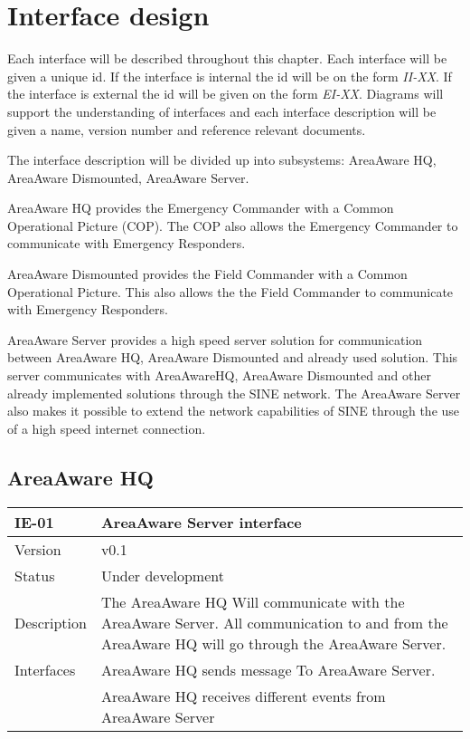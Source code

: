 \label{chp_interfaceDesign}
\chapter{Interface design}
Each interface will be described throughout this chapter. Each interface will be given a unique id. If the interface is internal the id will be on the form \emph{II-XX}. If the interface is external the id will be given on the form \emph{EI-XX}. Diagrams will support the understanding of interfaces and each interface description will be given a name, version number and reference relevant documents.

The interface description will be divided up into subsystems: AreaAware HQ, AreaAware Dismounted, AreaAware Server.

AreaAware HQ provides the Emergency Commander with a Common Operational Picture (COP). The COP also allows the Emergency Commander to communicate with Emergency Responders.

AreaAware Dismounted provides the Field Commander with a Common Operational Picture. This also allows the the Field Commander to communicate with Emergency Responders. 

AreaAware Server provides a high speed server solution for communication between AreaAware HQ, AreaAware Dismounted and already used solution. This server communicates with AreaAwareHQ, AreaAware Dismounted and other already implemented solutions through the SINE network. The AreaAware Server also makes it possible to extend the network capabilities of SINE through the use of a high speed internet connection.


\section{AreaAware HQ}

\begin{longtable}{| p{3.5cm} |  p{10cm} | }
	\hline
	\textbf{IE-01} &  \textbf{AreaAware Server interface } \\
	\hline
	Version & v0.1 \\
	\hline
	Status & Under development \\
	\hline
	 Description & The AreaAware HQ Will communicate with the AreaAware Server. All communication to and from the AreaAware HQ will go through the AreaAware Server. 
	  \\
	\hline
	 Interfaces & AreaAware HQ sends message To AreaAware Server.  \\
					   & AreaAware HQ receives different events from AreaAware Server  \\
	\hline
\end{longtable}


